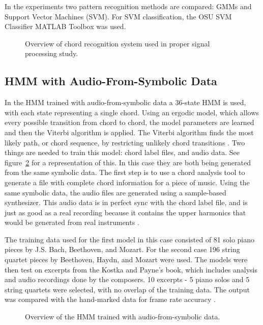 \documentclass{sig-alternate}
\begin{document}
In the experiments two pattern recognition methods are compared: GMMs and Support Vector Machines (SVM). For SVM classification, the OSU SVM Classifier MATLAB Toolbox was used. 

\begin{figure}
\centering
{}
\caption{Overview of chord recognition system used in proper signal processing study.}
\label{fig:fig2}
\end{figure}

\subsection{HMM with Audio-From-Symbolic Data}

In the HMM trained with audio-from-symbolic data \cite{Lee:2006} a 36-state HMM is used, with each state representing a single chord. Using an ergodic model, which allows every possible transition from chord to chord, the model parameters are learned and then the Viterbi algorithm is applied. The Viterbi algorithm finds the most likely path, or chord sequence, by restricting unlikely chord transitions \cite{TaeMin:2014}. Two things are needed to train this model: chord label files, and audio data. See figure~\ref{fig:fig1} for a representation of this. In this case they are both being generated from the same symbolic data. The first step is to use a chord analysis tool to generate a file with complete chord information for a piece of music. Using the same symbolic data, the audio files are generated using a sample-based synthesizer. This audio data is in perfect sync with the chord label file, and is just as good as a real recording because it contains the upper harmonics that would be generated from real instruments \cite{Lee:2006}.


The training data used for the first model in this case consisted of 81 solo piano pieces by J.S. Bach, Beethoven, and Mozart. For the second case 196 string quartet pieces by Beethoven, Haydn, and Mozart were used. The models were then test on excerpts from the Kostka and Payne's book, which includes analysis and audio recordings done by the composers. 10 excerpts - 5 piano solos and 5 string quartets were selected, with no overlap of the training data. The output was compared with the hand-marked data for frame rate accuracy \cite{Lee:2006}. 

\begin{figure}
\centering
{}
\caption{Overview of the HMM trained with audio-from-symbolic data.}
\label{fig:fig1}
\end{figure}
\end{document}
